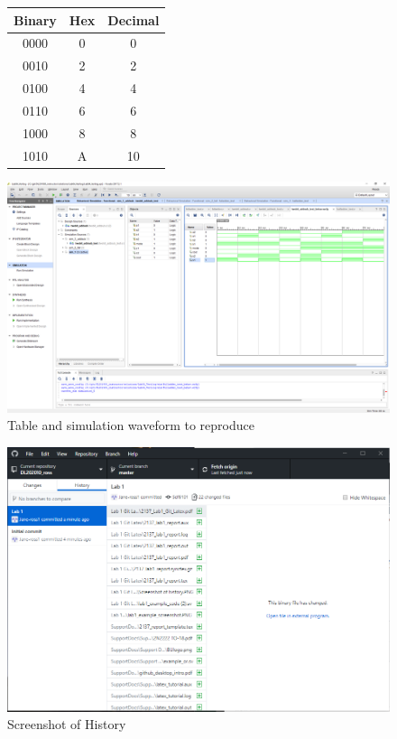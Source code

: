 \documentclass[11pt]{article}
\begin{document}
\begin{figure}[ht]\centering
	
	\begin{tabular}{c|c|c}
		\toprule
		Binary & Hex & Decimal \\
		\midrule
		0000 & 0 & 0 \\
		0010 & 2 & 2 \\
		0100 & 4 & 4 \\
		0110 & 6 & 6 \\
		1000 & 8 & 8 \\
		1010 & A & 10 \\
		\bottomrule
	\end{tabular}

	\centering
	\includegraphics[scale = 0.70,trim={18cm 15cm 0 4cm},clip]{lab1_example_screenshot}

	\caption{Table and simulation waveform to reproduce}
	\label{fig:lab1examplescreenshot}

\end{figure}

	

	
\begin{figure}
	\centering
	\includegraphics[width=0.7\linewidth]{"Screenshot of history"}
	\caption{Screenshot of History}
	\label{fig:screenshot-of-history}
\end{figure}
\end{document}
